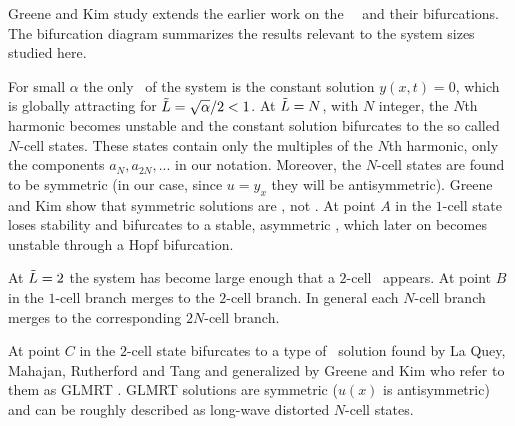 Greene and Kim study extends the earlier work
on the \KS\ \eqva\ and their bifurcations. The 
bifurcation diagram  summarizes the results
relevant to the system sizes studied here. 

For small $\alpha$ the only \eqv\ of the system is the constant solution $y(x,t)=0$,
which is globally attracting 
for $\tilde{L}=\sqrt{\alpha}/2<1$. At $\tilde{L}=N$, with $N$ integer, 
the $N$th harmonic becomes unstable and the constant solution
bifurcates to the so called $N$-cell states. 
These states contain only the multiples of the $N$th
harmonic, {\ie} only the components $a_N,a_{2N},...$ in our notation. 
Moreover, the $N$-cell states are found to be symmetric (in our case, since $u=y_x$ they will be
antisymmetric). 
Greene and Kim show that symmetric solutions are \eqva, not \reqva. 
At point $A$ in  the $1$-cell state loses stability
and bifurcates to a stable, 
asymmetric \reqv, which later on becomes unstable through a Hopf bifurcation. 

At $\tilde{L}=2$ the system has become large enough that a $2$-cell \eqv\ appears. At point $B$
in  the $1$-cell branch merges to the $2$-cell branch. In general each $N$-cell branch merges to the corresponding $2N$-cell branch.

At point $C$ in  the $2$-cell state bifurcates to a type of 
\eqv\ solution
found by La Quey, Mahajan, Rutherford and Tang and generalized by Greene and Kim who refer to them as GLMRT \eqva. GLMRT solutions are symmetric 
($u(x)$ is antisymmetric)
and can be roughly described as long-wave distorted $N$-cell states.

